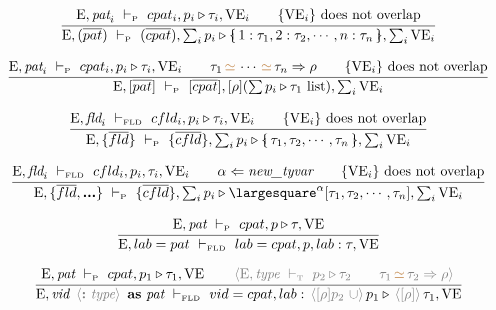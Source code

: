 \documentclass[11pt,a4paper]{article}
\newcommand{\key}[1]{\textrm{\textbf{#1}}}
\newcommand{\prodlhs}[1]{\textit{#1}}
\newcommand{\record}[1]{\{\!\!\shortmid #1 \shortmid\!\!\}}
\newcommand{\irecrd}[2]{\largesquare^{#1}{#2}}
\newcommand{\qualtype}[2]{#1 \triangleright #2}
\newcommand{\unify}[3]{#1\,{\color{brown}{\simeq}}\,#2 \Rightarrow #3}
\newcommand{\unifylist}[3]{#1\,{\color{brown}{\simeq}}\,\cdots\,{\color{brown}{\simeq}}\,#2 \Rightarrow #3}
\newcommand{\braced}[1]{\{#1\}}
\newcommand{\angled}[1]{\,{\color{gray}\langle#1\rangle}\,}
\newcommand{\Env}  {\textrm{E}}
\newcommand{\VE}   {\textrm{VE}}
\newcommand{\vdashP}  {\ \vdash_{\textrm{\tiny P}}\  }
\newcommand{\vdashT}  {\ \vdash_{\textrm{\tiny T}}\  }
\newcommand{\vdashFLD}{\ \vdash_\textrm{\tiny FLD}\  }
\newcommand{\corenew}[1]{\textit{new\_#1}}
\begin{document}
\[
\cfrac
 {\Env,\prodlhs{pat}_i \vdashP cpat_i,\qualtype{p_i}{\tau_i},\VE_i \qquad
  \braced{\VE_i}\ \textrm{does not overlap}}
 {\Env, (\overline{pat}) \vdashP
  (\overline{cpat}), \qualtype{\sum_i p_i}{\record{1:\tau_1,2:\tau_2,\cdots,n:\tau_n}}, \sum_i\VE_i}
\]

\[
\cfrac
 {\Env,\prodlhs{pat}_i \vdashP cpat_i,\qualtype{p_i}{\tau_i},\VE_i  \qquad
  \unifylist{\tau_1}{\tau_n}{\rho}                                  \qquad
  \braced{\VE_i}\ \textrm{does not overlap}}
 {\Env, [\overline{pat}] \vdashP
    [\overline{cpat}], [\rho](\qualtype{\sum p_i}{\tau_1\ \textrm{list}}), \sum_i\VE_i}
\]

\[
\cfrac
 {\Env,\prodlhs{fld}_i \vdashFLD cfld_i,\qualtype{p_i}{\tau_i},\VE_i \qquad
  \braced{\VE_i}\ \textrm{does not overlap}}
 {\Env, \braced{\overline{fld}} \vdashP
    \braced{\overline{cfld}}, \qualtype{\sum_i p_i}{\record{\tau_1,\tau_2,\cdots,\tau_n}}, \sum_i\VE_i}
\]

\[
\cfrac
 {\Env,\prodlhs{fld}_i \vdashFLD cfld_i,p_i,\tau_i,\VE_i \qquad
  \alpha \Leftarrow \corenew{tyvar}                      \qquad
  \braced{\VE_i}\ \textrm{does not overlap}}
 {\Env, \braced{\overline{fld},\key{...}} \vdashP
    \braced{\overline{cfld}}, \qualtype{\sum_i p_i}{\irecrd{\alpha}{[\tau_1,\tau_2,\cdots,\tau_n]}}, \sum_i\VE_i}
\]

\[
\cfrac
 {\Env,\prodlhs{pat} \vdashP cpat, \qualtype{p}{\tau}, \VE}
 {\Env, lab = pat \vdashFLD lab=cpat, p, lab:\tau, \VE }
\]

\[
\cfrac
 {\Env,\prodlhs{pat}  \vdashP cpat,\qualtype{p_1}{\tau_1}, \VE      \qquad
  \angled{\Env,\prodlhs{type} \vdashT \qualtype{p_2}{\tau_2}        \qquad
  \unify{\tau_1}{\tau_2}{\rho}}}
 {\Env, \prodlhs{vid}\ \angled{\key{:}\ \prodlhs{type}}\ \key{as}\ \prodlhs{pat}  \vdashFLD 
    vid=cpat, lab:\qualtype{\angled{[\rho]p_2\ \cup} p_1}{\angled{[\rho]}\tau_1}, \VE }
\]
\end{document}
